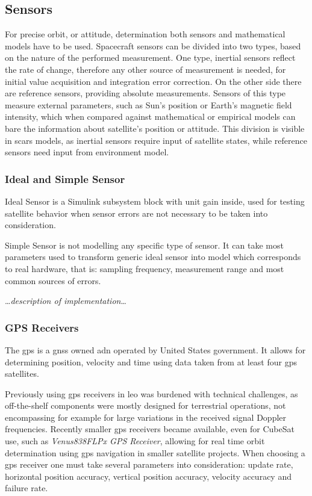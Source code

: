\subsection{Sensors}
    For precise orbit, or attitude, determination both sensors and mathematical models have to be used. Spacecraft sensors can be divided into two types, based on the nature of the performed measurement. One type, inertial sensors reflect the rate of change, therefore any other source of measurement is needed, for initial value acquisition and integration error correction. On the other side there are reference sensors, providing absolute measurements. Sensors of this type measure external parameters, such as Sun's position or Earth's magnetic field intensity, which when compared against mathematical or empirical models can bare the information about satellite's position or attitude. This division is visible in \ac{scars} models, as inertial sensors require input of satellite states, while reference sensors need input from environment model.

    \subsubsection{Ideal and Simple Sensor}
        Ideal Sensor is a Simulink subsystem block with unit gain inside, used for testing satellite behavior when sensor errors are not necessary to be taken into consideration.

        Simple Sensor is not modelling any specific type of sensor. It can take most parameters used to transform generic ideal sensor into model which corresponds to real hardware, that is: sampling frequency, measurement range and most common sources of errors.

        \dots\textit{description of implementation}\dots

    \subsubsection{GPS Receivers}
        The \ac{gps} is a \ac{gnss} owned adn operated by United States government. It allows for determining position, velocity and time using data taken from at least four \ac{gps} satellites.

        Previously using \ac{gps} receivers in \ac{leo} was burdened with technical challenges, as off-the-shelf components were mostly designed for terrestrial operations, not encompassing for example for large variations in the received signal Doppler frequencies. Recently smaller \ac{gps} receivers became available, even for CubeSat use, such as \textit{Venus838FLPx GPS Receiver}\cite{gpsdatasheet}, allowing for real time orbit determination using \ac{gps} navigation in smaller satellite projects.\cite{gomes2007real} When choosing a \ac{gps} receiver one must take several parameters into consideration: update rate, horizontal position accuracy, vertical position accuracy, velocity accuracy and failure rate.
        

